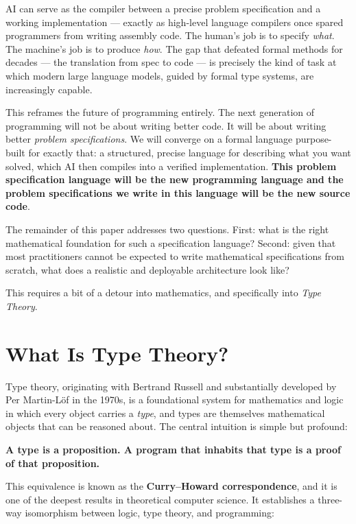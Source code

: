 \documentclass[12pt]{article}
\begin{document}
AI can serve as the compiler between a precise problem specification and a
working implementation --- exactly as high-level language compilers once
spared programmers from writing assembly code. The human's job is to specify
\emph{what}. The machine's job is to produce \emph{how}. The gap that
defeated formal methods for decades --- the translation from spec to code ---
is precisely the kind of task at which modern large language models, guided
by formal type systems, are increasingly capable.

This reframes the future of programming entirely. The next generation of
programming will not be about writing better code. It will be about writing
better \emph{problem specifications}. We will converge on a formal language
purpose-built for exactly that: a structured, precise language for describing
what you want solved, which AI then compiles into a verified implementation.
\textbf{This problem specification language will be the new programming language
and the problem specifications we write in this language will be the new source code}.

The remainder of this paper addresses two questions. First: what is the right
mathematical foundation for such a specification language? Second: given that
most practitioners cannot be expected to write mathematical specifications
from scratch, what does a realistic and deployable architecture look like?

This requires a bit of a detour into mathematics, and specifically into \emph{Type Theory}.

\section{What Is Type Theory?}

Type theory, originating with Bertrand Russell and substantially developed by
Per Martin-L\"{o}f in the 1970s, is a foundational system for mathematics and
logic in which every object carries a \emph{type}, and types are themselves
mathematical objects that can be reasoned about. The central intuition is
simple but profound:

\begin{center}
\textbf{A type is a proposition. A program that inhabits that type is a proof
of that proposition.}
\end{center}

This equivalence is known as the \textbf{Curry--Howard correspondence}, and it
is one of the deepest results in theoretical computer science. It establishes
a three-way isomorphism between logic, type theory, and programming:
\end{document}
